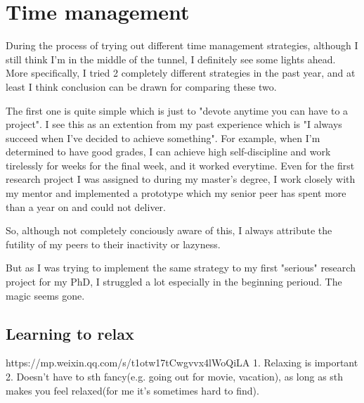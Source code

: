 \section{Time management}
\label{sec:time}
During the process of trying out different time management strategies, although I still think I'm in the middle of the tunnel, I definitely see some lights ahead.
More specifically, I tried 2 completely different strategies in the past year, and at least I think conclusion can be drawn for comparing these two.

The first one is quite simple which is just to "devote anytime you can have to a project".
I see this as an extention from my past experience which is "I always succeed when I've decided to achieve something".
For example, when I'm determined to have good grades, I can achieve high self-discipline and work tirelessly for weeks for the final week, and it worked everytime.
Even for the first research project I was assigned to during my master's degree, I work closely with my mentor and implemented a prototype 
which my senior peer has spent more than a year on and could not deliver.

So, although not completely conciously aware of this, I always attribute the futility of my peers to their inactivity or lazyness.

But as I was trying to implement the same strategy to my first "serious" research project for my PhD, I struggled a lot especially in the beginning perioud.
The magic seems gone.
\subsection{Learning to relax}
https://mp.weixin.qq.com/s/t1otw17tCwgvvx4lWoQiLA
1. Relaxing is important
2. Doesn't have to sth fancy(e.g. going out for movie, vacation), as long as sth makes you feel relaxed(for me it's sometimes hard to find).